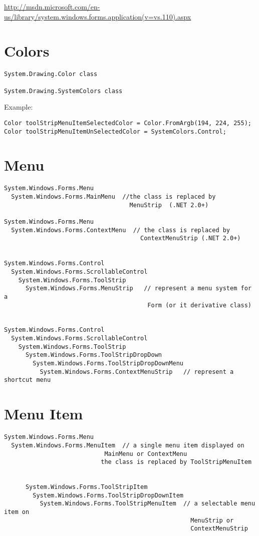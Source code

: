 \url{http://msdn.microsoft.com/en-us/library/system.windows.forms.application(v=vs.110).aspx}


\section{Colors}


\begin{verbatim}
System.Drawing.Color class

System.Drawing.SystemColors class
\end{verbatim}

Example:
\begin{verbatim}
Color toolStripMenuItemSelectedColor = Color.FromArgb(194, 224, 255);
Color toolStripMenuItemUnSelectedColor = SystemColors.Control;
\end{verbatim}

\section{Menu}

\begin{verbatim}
System.Windows.Forms.Menu
  System.Windows.Forms.MainMenu  //the class is replaced by 
                                   MenuStrip  (.NET 2.0+)
  
System.Windows.Forms.Menu
  System.Windows.Forms.ContextMenu  // the class is replaced by
                                      ContextMenuStrip (.NET 2.0+)
        
  
System.Windows.Forms.Control
  System.Windows.Forms.ScrollableControl
    System.Windows.Forms.ToolStrip
      System.Windows.Forms.MenuStrip   // represent a menu system for a
                                        Form (or it derivative class)
            

System.Windows.Forms.Control
  System.Windows.Forms.ScrollableControl
    System.Windows.Forms.ToolStrip
      System.Windows.Forms.ToolStripDropDown
        System.Windows.Forms.ToolStripDropDownMenu
          System.Windows.Forms.ContextMenuStrip   // represent a shortcut menu                                   
\end{verbatim}

\section{Menu Item}

\begin{verbatim}
System.Windows.Forms.Menu
  System.Windows.Forms.MenuItem  // a single menu item displayed on
                            MainMenu or ContextMenu 
                           the class is replaced by ToolStripMenuItem


      System.Windows.Forms.ToolStripItem
        System.Windows.Forms.ToolStripDropDownItem
          System.Windows.Forms.ToolStripMenuItem  // a selectable menu item on
                                                    MenuStrip or
                                                    ContextMenuStrip
\end{verbatim}

